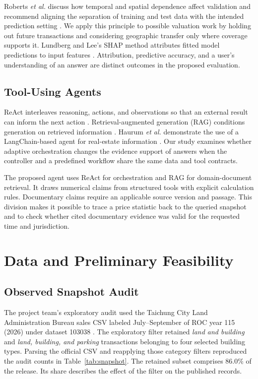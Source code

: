 \documentclass[conference]{IEEEtran}
\begin{document}
Roberts \emph{et al.} discuss how temporal and spatial dependence affect validation and recommend aligning the separation of training and test data with the intended prediction setting \cite{roberts}. We apply this principle to possible valuation work by holding out future transactions and considering geographic transfer only where coverage supports it. Lundberg and Lee's SHAP method attributes fitted model predictions to input features \cite{shap}. Attribution, predictive accuracy, and a user's understanding of an answer are distinct outcomes in the proposed evaluation.

\subsection{Tool-Using Agents}
ReAct interleaves reasoning, actions, and observations so that an external result can inform the next action \cite{react}. Retrieval-augmented generation (RAG) conditions generation on retrieved information \cite{rag}. Haurum \emph{et al.} demonstrate the use of a LangChain-based agent for real-estate information \cite{haurum}. Our study examines whether adaptive orchestration changes the evidence support of answers when the controller and a predefined workflow share the same data and tool contracts.

The proposed agent uses ReAct for orchestration and RAG for domain-document retrieval. It draws numerical claims from structured tools with explicit calculation rules. Documentary claims require an applicable source version and passage. This division makes it possible to trace a price statistic back to the queried snapshot and to check whether cited documentary evidence was valid for the requested time and jurisdiction.

\section{Data and Preliminary Feasibility}
\label{sec:data}
\subsection{Observed Snapshot Audit}
The project team's exploratory audit used the Taichung City Land Administration Bureau sales CSV labeled July--September of ROC year 115 (2026) under dataset 103038 \cite{taichung}. The exploratory filter retained \emph{land and building} and \emph{land, building, and parking} transactions belonging to four selected building types. Parsing the official CSV and reapplying those category filters reproduced the audit counts in Table~\ref{tab:snapshot}. The retained subset comprises 86.0\% of the release. Its share describes the effect of the filter on the published records.
\end{document}
